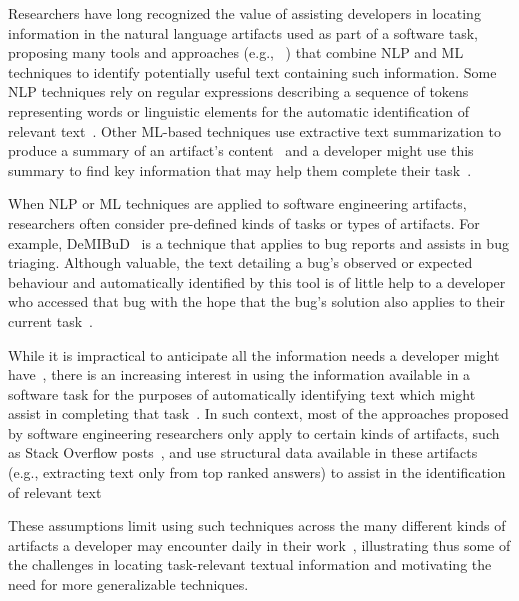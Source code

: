 





Researchers have long recognized the value of 
 assisting developers in locating information in the natural language artifacts used as part of a software task,
proposing many tools and approaches (e.g., ~\cite{nadi2020, Robillard2015, Xu2017})
that combine \acf{NLP} and \acf{ML} techniques to identify potentially useful text containing such information. 
Some \acs{NLP} techniques rely on regular expressions describing a sequence of tokens
representing words or linguistic elements for the automatic identification 
of relevant text~\cite{Bavota2016, Chaparro2017}. 
Other \acs{ML}-based techniques use extractive text summarization 
to produce a summary of an artifact's content~\cite{Lotufo2012, Ponzanelli2015}
and a developer might use this summary to find key information
that may help them complete their task~\cite{Bavota2016}.



When \acs{NLP} or \acs{ML} techniques are applied to software engineering artifacts, researchers often 
consider pre-defined kinds of tasks or types of artifacts.
For example, {\small DeMIBuD}~\cite{Chaparro2017} is a technique that applies to bug reports and 
assists in bug triaging. Although valuable, the text   detailing a bug's observed or expected
behaviour and automatically identified by this tool
 is of little help to a developer who accessed that bug 
with the hope that the bug's solution also applies to their current task~\cite{Viviani2019}.


While it is impractical to anticipate all the information needs a developer might have~\cite{sillito2006, josyula2018, ko2007}, there is an increasing interest in using the information 
available in a software task for the purposes of automatically identifying text 
which might assist in completing that task~\cite{Bavota2016}. 
In such context, most of the approaches proposed by software engineering researchers 
 only apply to certain kinds of artifacts, such as Stack Overflow posts~\cite{Xu2017, silva2019}, 
 and use structural data available in these artifacts (e.g., extracting text only from top ranked answers)  to assist in the identification of relevant text
 
These assumptions limit using such techniques across the
many different kinds of artifacts a developer may encounter
daily in their work~\cite{Li2013}, 
illustrating thus some of the challenges in locating task-relevant textual
information and motivating the need for more generalizable techniques.




